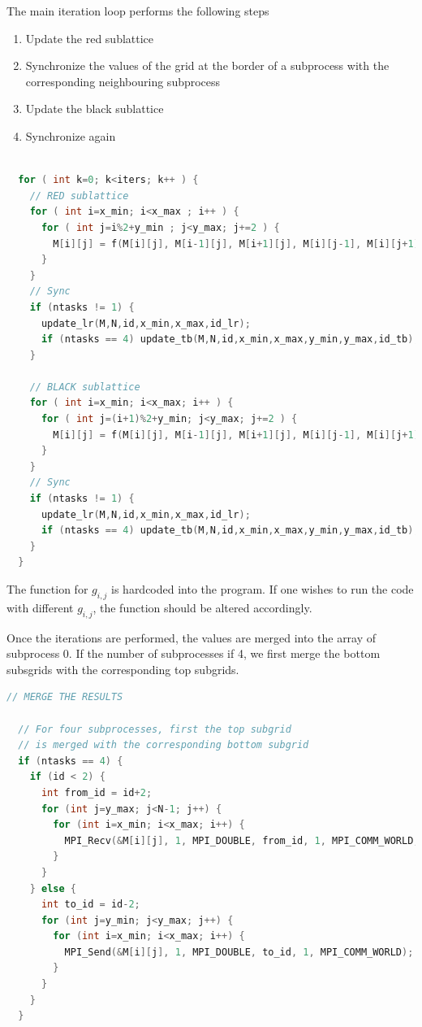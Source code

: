 \documentclass[12pt, letterpaper]{article}
\begin{document}
The main iteration loop performs the following steps
\begin{enumerate}
  \item
    Update the red sublattice
  \item
    Synchronize the values of the grid at the border of a subprocess with the corresponding neighbouring subprocess
  \item
    Update the black sublattice
  \item
    Synchronize again
\end{enumerate}

\begin{lstlisting}[language=C++]
  
  for ( int k=0; k<iters; k++ ) {
    // RED sublattice
    for ( int i=x_min; i<x_max ; i++ ) {
      for ( int j=i%2+y_min ; j<y_max; j+=2 ) {
        M[i][j] = f(M[i][j], M[i-1][j], M[i+1][j], M[i][j-1], M[i][j+1], g(i,j,N), N);
      }
    }
    // Sync
    if (ntasks != 1) {
      update_lr(M,N,id,x_min,x_max,id_lr);
      if (ntasks == 4) update_tb(M,N,id,x_min,x_max,y_min,y_max,id_tb);
    } 

    // BLACK sublattice
    for ( int i=x_min; i<x_max; i++ ) {
      for ( int j=(i+1)%2+y_min; j<y_max; j+=2 ) {
        M[i][j] = f(M[i][j], M[i-1][j], M[i+1][j], M[i][j-1], M[i][j+1], g(i,j,N), N);
      }
    }
    // Sync
    if (ntasks != 1) {
      update_lr(M,N,id,x_min,x_max,id_lr);
      if (ntasks == 4) update_tb(M,N,id,x_min,x_max,y_min,y_max,id_tb);
    } 
  }
\end{lstlisting}
The function for $g_{i,j}$ is hardcoded into the program.
If one wishes to run the code with different $g_{i,j}$, the function should be altered accordingly.

Once the iterations are performed, the values are merged into the array of subprocess 0.
If the number of subprocesses if 4, we first merge the bottom subsgrids with the corresponding top subgrids.
\begin{lstlisting}[language=C++]
  // MERGE THE RESULTS
  
  // For four subprocesses, first the top subgrid 
  // is merged with the corresponding bottom subgrid
  if (ntasks == 4) {
    if (id < 2) {
      int from_id = id+2;
      for (int j=y_max; j<N-1; j++) {
        for (int i=x_min; i<x_max; i++) {
          MPI_Recv(&M[i][j], 1, MPI_DOUBLE, from_id, 1, MPI_COMM_WORLD, MPI_STATUS_IGNORE);
        }
      }
    } else {
      int to_id = id-2;
      for (int j=y_min; j<y_max; j++) {
        for (int i=x_min; i<x_max; i++) {
          MPI_Send(&M[i][j], 1, MPI_DOUBLE, to_id, 1, MPI_COMM_WORLD);
        }
      }
    }
  }
\end{lstlisting}
\end{document}
